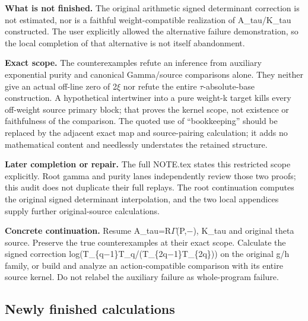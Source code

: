 \textbf{What is not finished.} The original arithmetic signed
determinant correction is not estimated, nor is a faithful
weight-compatible realization of A\_tau/K\_tau constructed. The user
explicitly allowed the alternative failure demonstration, so the local
completion of that alternative is not itself abandonment.

\textbf{Exact scope.} The counterexamples refute an inference from
auxiliary exponential purity and canonical Gamma/source comparisons
alone. They neither give an actual off-line zero of
2\allowbreak{}\ensuremath{ξ}\allowbreak{} nor refute the entire
\allowbreak{}\ensuremath{τ}\allowbreak{}-absolute-base construction. A
hypothetical intertwiner into a pure weight-k target kills every
off-weight source primary block; that proves the kernel scope, not
existence or faithfulness of the comparison. The quoted use of
``bookkeeping'' should be replaced by the adjacent exact map and
source-pairing calculation; it adds no mathematical content and
needlessly understates the retained structure.

\textbf{Later completion or repair.} The full NOTE.tex states this
restricted scope explicitly. Root gamma and purity lanes independently
review those two proofs; this audit does not duplicate their full
replays. The root continuation computes the original signed determinant
interpolation, and the two local appendices supply further
original-source calculations.

\textbf{Concrete continuation.} Resume
A\_tau=R\allowbreak{}\ensuremath{Γ}\allowbreak{}(P,\allowbreak{}\ensuremath{−}\allowbreak{}),
K\_tau and original theta source. Preserve the true counterexamples at
their exact scope. Calculate the signed correction
log(T\_\{q\allowbreak{}\ensuremath{−}\allowbreak{}1\}T\_q/(T\_\{2q\allowbreak{}\ensuremath{−}\allowbreak{}1\}T\_\{2q\}))
on the original g/h family, or build and analyze an action-compatible
comparison with its entire source kernel. Do not relabel the auxiliary
failure as whole-program failure.

\subsection{Newly finished
calculations}\label{TranscriptLedgerStage:newly-finished-calculations}

